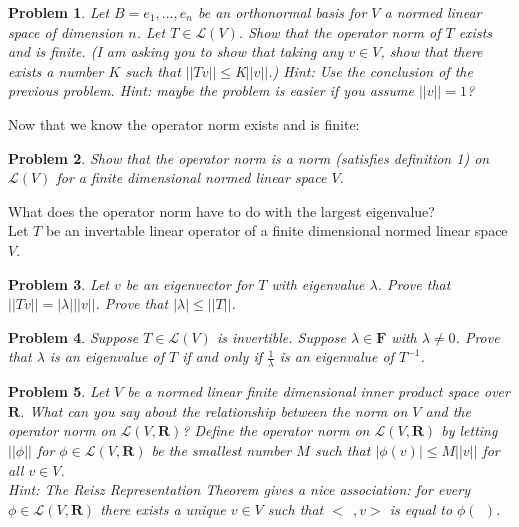 \documentclass{article}
\theoremstyle{problemstyle}
\newtheorem{problem}{Problem}
\theoremstyle{problemstyle}
\theoremstyle{problemstyle}
\theoremstyle{problemstyle}
\begin{document}
\begin{problem}
Let $B = e_1,...,e_n$ be an orthonormal basis for $V$ a normed linear space of dimension $n$. Let $T \in \mathscr{L}(V)$. Show that the operator norm of $T$ exists and is finite. (I am asking you to show that taking any $v \in V$, show that there exists a number $K$ such that $||Tv|| \leq $K$||v||$.) Hint: Use the conclusion of the previous problem. Hint: maybe the problem is easier if you assume $||v|| = 1$? 
\end{problem}

Now that we know the operator norm exists and is finite:

\begin{problem}
Show that the operator norm is a norm (satisfies definition 1) on $\mathscr{L}(V)$ for a finite dimensional normed linear space $V$.  
\end{problem}

What does the operator norm have to do with the largest eigenvalue?\\
\vspace{3mm}
Let $T$ be an invertable linear operator of a finite dimensional normed linear space $V$. 

\begin{problem}
Let $v$ be an eigenvector for $T$ with eigenvalue $\lambda$. Prove that $||Tv|| = |\lambda|||v||$. Prove that $|\lambda| \leq ||T||$. 
\end{problem}

\begin{problem}
Suppose $T \in \mathscr{L}(V)$ is invertible. Suppose $\lambda \in \textbf{F}$ with $\lambda\neq 0$. Prove that $\lambda$ is an eigenvalue of $T$ if and only if $\frac{1}{\lambda}$ is an eigenvalue of $T^{-1}$. 
\end{problem}

\begin{problem}
Let $V$ be a normed linear finite dimensional inner product space over $\textbf{R}$. What can you say about the relationship between the norm on $V$ and the operator norm on $\mathscr{L}(V,\textbf{R})$? Define the operator norm on $\mathscr{L}(V,\textbf{R})$ by letting $||\phi||$ for $\phi \in \mathscr{L}(V,\textbf{R})$ be the smallest number $M$ such that $|\phi(v)| \leq M||v||$ for all $v\in V$.\\ 

Hint: The Reisz Representation Theorem gives a nice association: for every $\phi \in \mathscr{L}(V,\textbf{R})$ there exists a unique $v \in V$ such that $< \ \  ,v>$ is equal to $\phi( \ \ )$.  
\end{problem}
\end{document}
